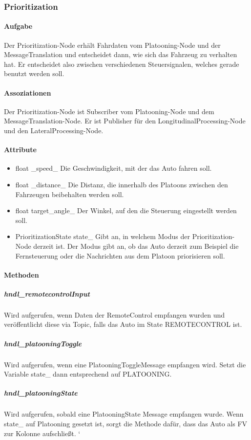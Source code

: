 \documentclass[a4paper, 12pt, titlepage]{scrartcl}
\begin{document}
			\subsubsection{Prioritization}
			\label{prioritization}
				\paragraph{Aufgabe} Der Prioritization-Node erhält Fahrdaten vom Platooning-Node und der MessageTranslation und entscheidet dann, wie sich das Fahrzeug zu verhalten hat. Er entscheidet also zwischen verschiedenen Steuersignalen, welches gerade benutzt werden soll. 
				\paragraph{Assoziationen} Der Prioritization-Node ist Subscriber vom Platooning-Node und dem MessageTranslation-Node. Er ist Publisher für den LongitudinalProcessing-Node und den LateralProcessing-Node. 
				\paragraph{Attribute}
					\begin{itemize}
						\item float \_speed\_ Die Geschwindigkeit, mit der das Auto fahren soll.
						\item float \_distance\_ Die Distanz, die innerhalb des Platoons zwischen den Fahrzeugen beibehalten werden soll. 
						\item float target\_angle\_ Der Winkel, auf den die Steuerung eingestellt werden soll.
						\item PrioritizationState state\_ Gibt an, in welchem Modus der Prioritization-Node derzeit ist. Der Modus gibt an, ob das Auto derzeit zum Beispiel die Fernsteuerung oder die Nachrichten aus dem Platoon priorisieren soll. 
					\end{itemize}
				\paragraph{Methoden}
					\subparagraph{hndl\_remotecontrolInput} Wird aufgerufen, wenn Daten der RemoteControl empfangen wurden und veröffentlicht diese via Topic, falls das Auto im State REMOTECONTROL ist.
					\subparagraph{hndl\_platooningToggle} Wird aufgerufen, wenn eine PlatooningToggleMessage empfangen wird. Setzt die Variable state\_ dann entsprechend auf PLATOONING. 
					\subparagraph{hndl\_platooningState} Wird aufgerufen, sobald eine PlatooningState Message empfangen wurde. Wenn state\_ auf Platooning gesetzt ist, sorgt die Methode dafür, dass das Auto als FV zur Kolonne aufschließt. ‘
\end{document}
